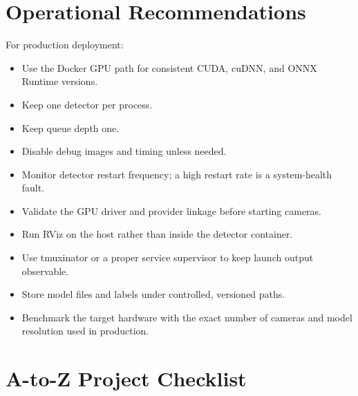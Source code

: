 \documentclass[11pt,a4paper]{article}
\begin{document}
\section{Operational Recommendations}

For production deployment:

\begin{itemize}
  \item Use the Docker GPU path for consistent CUDA, cuDNN, and ONNX Runtime versions.
  \item Keep one detector per process.
  \item Keep queue depth one.
  \item Disable debug images and timing unless needed.
  \item Monitor detector restart frequency; a high restart rate is a system-health fault.
  \item Validate the GPU driver and provider linkage before starting cameras.
  \item Run RViz on the host rather than inside the detector container.
  \item Use tmuxinator or a proper service supervisor to keep launch output observable.
  \item Store model files and labels under controlled, versioned paths.
  \item Benchmark the target hardware with the exact number of cameras and model resolution used in production.
\end{itemize}

\section{A-to-Z Project Checklist}
\end{document}
